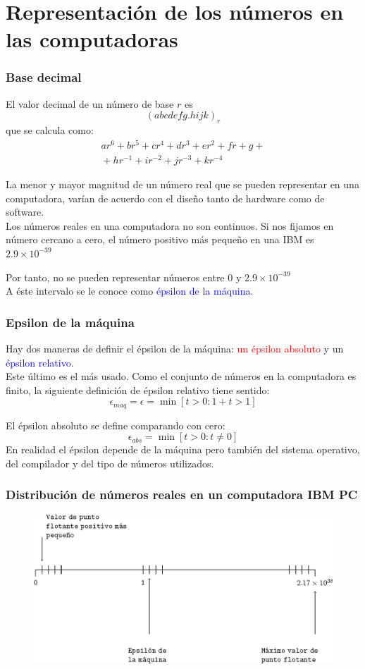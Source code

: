 \section{Representación de los números en las computadoras}
\begin{frame}
\frametitle{Base decimal}
El valor decimal de un número de base $r$ es
\[(abcdefg.hijk)_{r}\]
que se calcula como:
\begin{eqnarray*}
ar^{6} + br^{5} + cr^{4} + dr^{3} + er^{2} + fr +
 g + {} \\
{} + hr^{-1} + ir^{-2} + jr^{-3} + kr^{-4}
\end{eqnarray*}
\end{frame}
\begin{frame}
La menor y mayor magnitud de un número real que se pueden representar en una computadora, varían de acuerdo con el diseño tanto de hardware como de software.
\\
\bigskip
Los números reales en una computadora no son continuos. Si nos fijamos en número cercano a cero, el número positivo más pequeño en una IBM es $2.9 \times 10^{-39}$
\end{frame}
\begin{frame}
Por tanto, no se pueden representar números entre $0$ y $2.9 \times 10^{-39}$ 
\\
\bigskip
A éste intervalo se le conoce como \textcolor{blue}{épsilon de la máquina}.
\end{frame}
\begin{frame}
\frametitle{Epsilon de la máquina}
Hay dos maneras de definir el épsilon de la máquina: \textcolor{red}{un épsilon absoluto} y un \textcolor{blue}{épsilon relativo}.
\\
\bigskip
Este último es el más usado. Como el conjunto de números en la computadora es finito, la siguiente definición de épsilon relativo tiene sentido:
\[ \epsilon_{maq} = \epsilon = \min[t>0 : 1+t>1 ] \]
\end{frame}
\begin{frame}
El épsilon absoluto se define comparando con cero:
\[ \epsilon_{abs} = \min[t>0 : t \neq 0] \]
En realidad el épsilon depende de la máquina pero también del sistema operativo, del compilador y del tipo de números utilizados.
\end{frame}
\begin{frame}
\frametitle{Distribución de números reales en un computadora IBM PC}
\fontsize{10}{10}\selectfont
\begin{figure}
\centering
\includegraphics[scale=0.8]{epsilonmaquina.eps}
\end{figure}
\end{frame}
